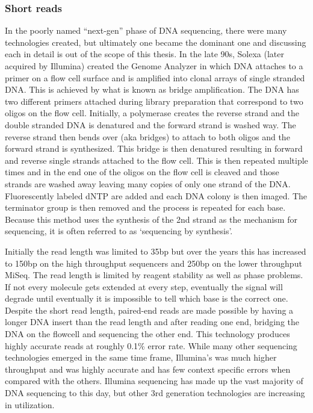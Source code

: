 \subsubsection{Short reads}\label{section:nextgen}

\par{
In the poorly named ``next-gen'' phase of DNA sequencing, there were many technologies created, but ultimately one became the dominant one and discussing each in detail is out of the scope of this thesis. In the late 90s, Solexa (later acquired by Illumina) created the Genome Analyzer in which DNA attaches to a primer on a flow cell surface and is amplified into clonal arrays of single stranded DNA\cite{flowcell}. This is achieved by what is known as bridge amplification. The DNA has two different primers attached during library preparation that correspond to two oligos on the flow cell. Initially, a polymerase creates the reverse strand and the double stranded DNA is denatured and the forward strand is washed way. The reverse strand then bends over (aka bridges) to attach to both oligos and the forward strand is synthesized. This bridge is then denatured resulting in forward and reverse single strands attached to the flow cell. This is then repeated multiple times and in the end one of the oligos on the flow cell is cleaved and those strands are washed away leaving many copies of only one strand of the DNA\cite{bridgeamp}. Fluorescently labeled dNTP are added and each DNA colony is then imaged. The terminator group is then removed\cite{reversibleterminator} and the process is repeated for each base. Because this method uses the synthesis of the 2nd strand as the mechanism for sequencing, it is often referred to as `sequencing by synthesis'. 
} \\

\par{
Initially the read length was limited to 35bp but over the years this has increased to 150bp on the high throughput sequencers and 250bp on the lower throughput MiSeq. The read length is limited by reagent stability as well as phase problems. If not every molecule gets extended at every step, eventually the signal will degrade until eventually it is impossible to tell which base is the correct one. Despite the short read length, paired-end reads are made possible by having a longer DNA insert than the read length and after reading one end, bridging the DNA on the flowcell and sequencing the other end. This technology produces highly accurate reads at roughly 0.1\% error rate. While many other sequencing technologies emerged in the same time frame, Illumina's was much higher throughput and was highly accurate and has few context specific errors when compared with the others\cite{errormotifs}. Illumina sequencing has made up the vast majority of DNA sequencing to this day, but other 3rd generation technologies are increasing in utilization.
} \\

